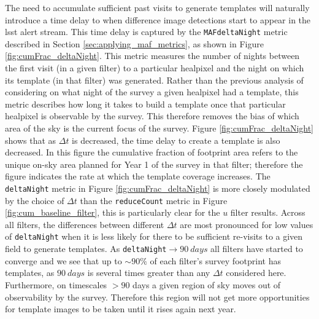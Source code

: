 \documentclass[preprintm,linenumbers]{aastex631}
\newcommand{\deltaNight}{\texttt{deltaNight}\xspace}
\newcommand{\reduceCount}{\texttt{reduceCount}\xspace}
\newcommand{\maf}{\texttt{MAF}\xspace}
\providecommand{\red}[1]{\textcolor{red}{#1}}
\begin{document}
		
		The need to accumulate sufficient past visits to generate templates will naturally introduce a time delay to when difference image detections start to appear in the \gls*{lsst} alert stream.
		This time delay is captured by the \maf \deltaNight metric described in Section \ref{sec:applying_maf_metrics}, as shown in Figure \ref{fig:cumFrac_deltaNight}.
		This metric measures the number of nights between the first visit (in a given filter) to a particular healpixel and the night on which its template (in that filter) was generated.
  Rather than the previous analysis of considering on what night of the survey a given healpixel had a template, this metric describes how long it takes to build a template once that particular healpixel is observable by the survey.
		This therefore removes the bias of which area of the sky is the current focus of the survey. %
Figure \ref{fig:cumFrac_deltaNight} shows that as $\Delta t$ is decreased, the time delay to create a template is also decreased.
		In this figure the cumulative fraction of footprint area refers to the unique on-sky area planned for Year 1 of the survey in that filter; therefore the figure indicates the rate at which the template coverage increases.
		The \deltaNight metric in Figure \ref{fig:cumFrac_deltaNight} is more closely modulated by the choice of $\Delta t$ than the \reduceCount metric in Figure \ref{fig:cum_baseline_filter}, this is particularly clear for the $u$ filter results. %
		Across all filters, the differences between different $\Delta t$ are most pronounced for low values of \deltaNight when it is less likely for there to be sufficient re-visits to a given field to generate templates. 
		As \deltaNight$\rightarrow 90\ \si{days}$ all filters have started to converge and we see that up to $\sim 90\%$ of each filter's survey footprint has templates, as $90\ \si{days}$ is several times greater than any $\Delta t$ considered here. 
  Furthermore, on timescales $>90$ days a given region of sky moves out of observability by the survey.
  Therefore this region will not get more opportunities for template images to be taken until it rises again next year. 
		\\
\end{document}
